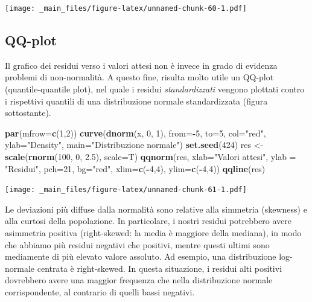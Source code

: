 \documentclass[a4paper,12pt,oneside]{book}
\newenvironment{Shaded}{\begin{snugshade}}{\end{snugshade}}
\newcommand{\KeywordTok}[1]{\textcolor[rgb]{0.13,0.29,0.53}{\textbf{#1}}}
\newcommand{\DataTypeTok}[1]{\textcolor[rgb]{0.13,0.29,0.53}{#1}}
\newcommand{\DecValTok}[1]{\textcolor[rgb]{0.00,0.00,0.81}{#1}}
\newcommand{\FloatTok}[1]{\textcolor[rgb]{0.00,0.00,0.81}{#1}}
\newcommand{\StringTok}[1]{\textcolor[rgb]{0.31,0.60,0.02}{#1}}
\newcommand{\OperatorTok}[1]{\textcolor[rgb]{0.81,0.36,0.00}{\textbf{#1}}}
\newcommand{\NormalTok}[1]{#1}
\theoremstyle{definition}
\theoremstyle{definition}
\theoremstyle{definition}
\theoremstyle{remark}
\begin{document}
\texttt{[image: \_main\_files/figure-latex/unnamed-chunk-60-1.pdf]}

\subsection{QQ-plot}\label{qq-plot}

Il grafico dei residui verso i valori attesi non è invece in grado di
evidenza problemi di non-normalità. A questo fine, risulta molto utile
un QQ-plot (quantile-quantile plot), nel quale i residui
\emph{standardizzati} vengono plottati contro i rispettivi quantili di
una distribuzione normale standardizzata (figura sottostante).

\begin{Shaded}
\begin{Highlighting}[]
\KeywordTok{par}\NormalTok{(}\DataTypeTok{mfrow=}\KeywordTok{c}\NormalTok{(}\DecValTok{1}\NormalTok{,}\DecValTok{2}\NormalTok{))}
\KeywordTok{curve}\NormalTok{(}\KeywordTok{dnorm}\NormalTok{(x, }\DecValTok{0}\NormalTok{, }\DecValTok{1}\NormalTok{), }\DataTypeTok{from=}\OperatorTok{-}\DecValTok{5}\NormalTok{, }\DataTypeTok{to=}\DecValTok{5}\NormalTok{, }\DataTypeTok{col=}\StringTok{"red"}\NormalTok{,}
      \DataTypeTok{ylab=}\StringTok{"Density"}\NormalTok{, }\DataTypeTok{main=}\StringTok{"Distribuzione normale"}\NormalTok{)}
\KeywordTok{set.seed}\NormalTok{(}\DecValTok{424}\NormalTok{)}
\NormalTok{res <-}\StringTok{ }\KeywordTok{scale}\NormalTok{(}\KeywordTok{rnorm}\NormalTok{(}\DecValTok{100}\NormalTok{, }\DecValTok{0}\NormalTok{, }\FloatTok{2.5}\NormalTok{), }\DataTypeTok{scale=}\NormalTok{T)}
\KeywordTok{qqnorm}\NormalTok{(res, }\DataTypeTok{xlab=}\StringTok{"Valori attesi"}\NormalTok{, }
     \DataTypeTok{ylab =} \StringTok{"Residui"}\NormalTok{, }\DataTypeTok{pch=}\DecValTok{21}\NormalTok{, }\DataTypeTok{bg=}\StringTok{"red"}\NormalTok{, }\DataTypeTok{xlim=}\KeywordTok{c}\NormalTok{(}\OperatorTok{-}\DecValTok{4}\NormalTok{,}\DecValTok{4}\NormalTok{),}
     \DataTypeTok{ylim=}\KeywordTok{c}\NormalTok{(}\OperatorTok{-}\DecValTok{4}\NormalTok{,}\DecValTok{4}\NormalTok{))}
\KeywordTok{qqline}\NormalTok{(res)}
\end{Highlighting}
\end{Shaded}

\texttt{[image: \_main\_files/figure-latex/unnamed-chunk-61-1.pdf]}

Le deviazioni più diffuse dalla normalità sono relative alla simmetria
(skewness) e alla curtosi della popolazione. In particolare, i nostri
residui potrebbero avere asimmetria positiva (right-skewed: la media è
maggiore della mediana), in modo che abbiamo più residui negativi che
positivi, mentre questi ultimi sono mediamente di più elevato valore
assoluto. Ad esempio, una distribuzione log-normale centrata è
right-skewed. In questa situazione, i residui alti positivi dovrebbero
avere una maggior frequenza che nella distribuzione normale
corrispondente, al contrario di quelli bassi negativi.
\end{document}
